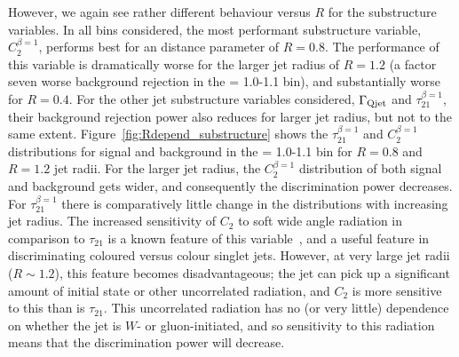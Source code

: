 However, we again see rather
different behaviour versus $R$ for the substructure variables. In all \pt bins
considered, the most performant substructure variable, $C_2^{\beta=1}$,
performs best for an \antikt distance parameter of $R=0.8$. The
performance of this variable is dramatically worse for the larger jet
radius of $R=1.2$ (a factor seven worse background rejection in
the \pt = 1.0-1.1 \TeV bin), and substantially worse for $R=0.4$. For the other
jet substructure variables considered, $\Gamma_{\rm Qjet}$ and
$\tau_{21}^{\beta=1}$, their background rejection
power also reduces for larger jet radius, but not to the same
extent. Figure~\ref{fig:Rdepend_substructure} shows the
$\tau_{21}^{\beta=1}$ and $C_2^{\beta=1}$ distributions for signal and
background in the \pt = 1.0-1.1 \TeV bin for $R=0.8$ and $R=1.2$ jet
radii. For the larger jet radius, the
$C_2^{\beta=1}$  distribution of both signal and background gets wider,
and consequently the discrimination power decreases. For
$\tau_{21}^{\beta=1}$ there is comparatively little change in the distributions
with increasing jet radius. The increased sensitivity of $C_{2}$ to
soft wide angle radiation in comparison to $\tau_{21}$ is a known
feature of this variable~\cite{Larkoski:2013eya}, and a useful feature
in discriminating coloured versus colour singlet jets. However, at
very large jet radii ($R\sim1.2$), this feature becomes
disadvantageous; the jet can pick up a significant amount of initial
state or other uncorrelated radiation, and $C_{2}$ is more sensitive
to this than is $\tau_{21}$.  This uncorrelated radiation has no (or
very little) dependence on whether the jet is $W$- or gluon-initiated, and so sensitivity to this radiation means that the discrimination power will decrease.


